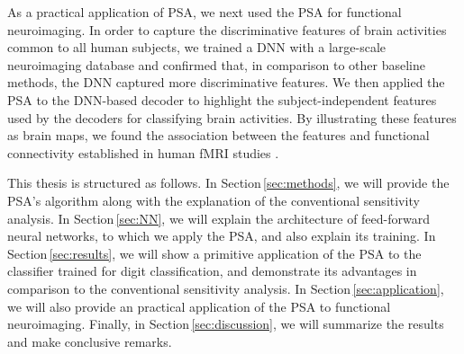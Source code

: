 As a practical application of PSA, we next used the PSA for functional neuroimaging.
%
In order to capture the discriminative features of brain activities
common to all human subjects,
we trained a DNN with a large-scale neuroimaging database and confirmed
that, in comparison to other baseline methods, the DNN captured more discriminative features.
%
We then applied the PSA to the DNN-based decoder to highlight the subject-independent
features used by the decoders for classifying brain activities.
%
By illustrating these features as brain maps, we found the association between
the features and functional connectivity established in human fMRI studies \cite{raichle2001default,raichle2007default,taylor2009two,cole2013multi}.

This thesis is structured as follows.
%
In Section\,\ref{sec:methods}, we will provide the PSA's algorithm along with
the explanation of the conventional sensitivity analysis.
%
In Section\,\ref{sec:NN}, we will explain the architecture of
 feed-forward neural networks, to which we apply the PSA, and
 also explain its training.
%
In Section\,\ref{sec:results}, we will show a primitive application of
the PSA to the classifier trained for digit classification,
and demonstrate its advantages in comparison to the conventional sensitivity analysis.
%
In Section\,\ref{sec:application}, we will also provide an practical
application of the PSA to functional neuroimaging.
%
Finally, in Section\,\ref{sec:discussion}, we will summarize the results
and make conclusive remarks.
